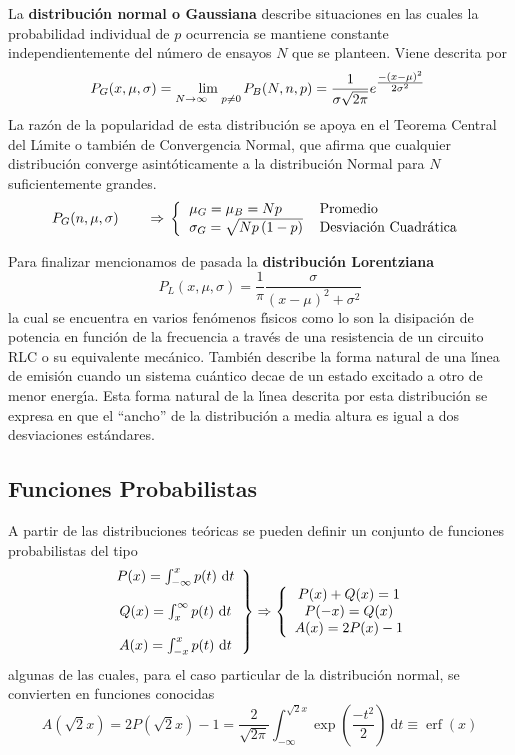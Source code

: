\documentclass[spanish,titlepage,11pt]{article}
\begin{document}
La \textbf{distribuci\'{o}n normal o Gaussiana} describe situaciones en las
cuales la probabilidad individual de $p$ ocurrencia se mantiene constante
inde\-pen\-dien\-te\-men\-te del n\'{u}mero de ensayos $N$ que se planteen.
Viene descrita por
\[
P_{G}(x,\mu,\sigma)=\lim_{N\rightarrow\infty\quad p\neq0}P_{B}(N,n,p)=\frac
{1}{\sigma\sqrt{2\pi}}{\Large e}^{\tfrac{-\left(  x-\mu\right)  ^{2}}%
{2\sigma^{2}}}\
\]
La raz\'{o}n de la popularidad de esta distribuci\'{o}n se apoya en el Teorema
Central del L\'{\i}mite o tambi\'{e}n de Convergencia Normal, que afirma que
cualquier distribuci\'{o}n converge asint\'{o}ticamente a la distribuci\'{o}n
Normal para $N$ suficientemente grandes.
\[
P_{G}(n,\mu,\sigma)\qquad\Rightarrow\,\left\{
\begin{tabular}
[c]{ll}%
$\mu_{G}=\mu_{B}=Np$ & $\text{Promedio}$\\
$\sigma_{G}=\sqrt{Np\left(  1-p\right)  }$ & Desviaci\'{o}n Cuadr\'{a}tica
\end{tabular}
\right.
\]

Para finalizar mencionamos de pasada la \textbf{distribuci\'{o}n Lorentziana}
\[
P_{L}(x,\mu,\sigma)=\frac{1}{\pi}\frac{\sigma}{\left(  x-\mu\right)
^{2}+\sigma^{2}}
\]
la cual se encuentra en varios fen\'{o}menos f\'{\i}sicos como lo son la
disipaci\'{o}n de potencia en funci\'{o}n de la frecuencia a trav\'{e}s de una
resistencia de un circuito RLC o su equivalente mec\'{a}nico. Tambi\'{e}n
describe la forma natural de una l\'{\i}nea de emisi\'{o}n cuando un sistema
cu\'{a}ntico decae de un estado excitado a otro de menor energ\'{\i}a. Esta
forma natural de la l\'{\i}nea descrita por esta distribuci\'{o}n se expresa
en que el ``ancho'' de la distribuci\'{o}n a media altura es igual a dos
desviaciones est\'{a}ndares.

\subsection{Funciones Probabilistas}

A partir de las distribuciones te\'{o}ricas se pueden definir un conjunto de
funciones probabilistas del tipo
\[
\left.
\begin{array}
[c]{c}%
P(x)=\int_{-\infty}^{x}p(t)\ \mathrm{d}t\\
\\
Q(x)=\int_{x}^{\infty}p(t)\ \mathrm{d}t\\
\\
A(x)=\int_{-x}^{x}p(t)\ \mathrm{d}t
\end{array}
\right\}  \Rightarrow\left\{
\begin{array}
[c]{c}%
P(x)+Q(x)=1\\
P(-x)=Q(x)\\
A(x)=2P(x)-1
\end{array}
\right.
\]
algunas de las cuales, para el caso particular de la distribuci\'{o}n normal,
se convierten en funciones conocidas
\[
A\left(  \sqrt{2}x\right)  =2P\left(  \sqrt{2}x\right)  -1=\frac{2}{\sqrt
{2\pi}}\int_{-\infty}^{\sqrt{2}x}\exp\left(  \frac{-t^{2}}{2}\right)
\ \mathrm{d}t\equiv\operatorname{erf}(x)
\]
\end{document}
